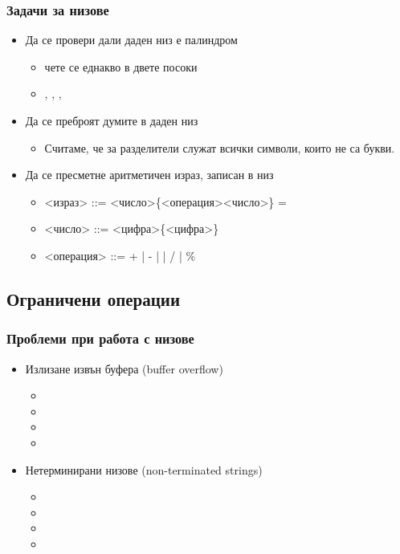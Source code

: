 \documentclass[alsotrans]{beamerswitch}
\begin{document}
\begin{frame}
  \frametitle{Задачи за низове}

  \begin{itemize}[<+->]
  \item Да се провери дали даден низ е \alert{палиндром}
    \begin{itemize}
    \item чете се еднакво в двете посоки
    \item {}, , , 
    \end{itemize}
  \item Да се преброят думите в даден низ
    \begin{itemize}
    \item Считаме, че за разделители служат всички символи, които не са букви.
    \end{itemize}
  \item Да се пресметне аритметичен израз, записан в низ
    \begin{itemize}
    \item{} <израз> ::= <число>\{<операция><число>\} \tta=
    \item{} <число> ::= <цифра>\{<цифра>\}
    \item{} <операция> ::= \tta+ | \tta- | \tta* | \tta/ | \tta\%
    \end{itemize}
  \end{itemize}
\end{frame}

\subsection{Ограничени операции}

\begin{frame}
  \frametitle{Проблеми при работа с низове}

  \begin{itemize}[<+->]
  \item Излизане извън буфера (buffer overflow)
    \begin{itemize}
    \item {}
    \item {}
    \item {}
    \item {}
    \end{itemize}
  \item Нетерминирани низове (non-terminated strings)
    \begin{itemize}
    \item {}
    \item {}
    \item {}
    \item {}
    \end{itemize}
  \end{itemize}
\end{frame}
\end{document}
